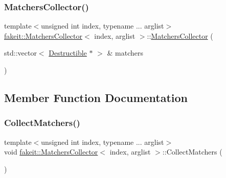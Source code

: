 \subsubsection{\texorpdfstring{MatchersCollector()}{MatchersCollector()}\hspace{0.1cm}{\footnotesize\ttfamily [9/9]}}
{\footnotesize\ttfamily template$<$unsigned int index, typename ... arglist$>$ \\
\mbox{\hyperlink{classfakeit_1_1MatchersCollector}{fakeit\+::\+Matchers\+Collector}}$<$ index, arglist $>$\+::\mbox{\hyperlink{classfakeit_1_1MatchersCollector}{Matchers\+Collector}} (\begin{DoxyParamCaption}\item[{std\+::vector$<$ \mbox{\hyperlink{classfakeit_1_1Destructible}{Destructible}} $\ast$ $>$ \&}]{matchers }\end{DoxyParamCaption})\hspace{0.3cm}{\ttfamily [inline]}}



\subsection{Member Function Documentation}
\mbox{\label{classfakeit_1_1MatchersCollector_a2d9a08a347c3915daa33f307a274f13c}} 
\subsubsection{\texorpdfstring{CollectMatchers()}{CollectMatchers()}\hspace{0.1cm}{\footnotesize\ttfamily [1/63]}}
{\footnotesize\ttfamily template$<$unsigned int index, typename ... arglist$>$ \\
void \mbox{\hyperlink{classfakeit_1_1MatchersCollector}{fakeit\+::\+Matchers\+Collector}}$<$ index, arglist $>$\+::Collect\+Matchers (\begin{DoxyParamCaption}{ }\end{DoxyParamCaption})\hspace{0.3cm}{\ttfamily [inline]}}

\mbox{\label{classfakeit_1_1MatchersCollector_a506da335b6062998e24371fcd3f9b7b5}} 
